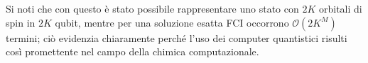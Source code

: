 Si noti che con questo  è stato possibile rappresentare uno stato con $2K$ orbitali di spin in $2K$ qubit, mentre per una soluzione esatta FCI occorrono $\mathcal{O}(2K^M)$ termini; ciò evidenzia chiaramente perché l’uso dei computer quantistici risulti così promettente nel campo della chimica computazionale.

